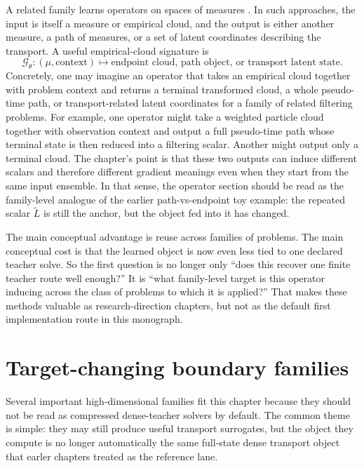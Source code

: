 A related family learns operators on spaces of measures
\citep{lu2021deeponet,li2021fourier,kovachki2023neuraloperator}.  In such
approaches, the input is itself a measure or empirical cloud, and the output is
either another measure, a path of measures, or a set of latent coordinates
describing the transport.  A useful empirical-cloud signature is
\begin{equation}
\label{eq:bf-neural-ot-dynamic-operator-signature}
  \mathcal G_\theta:
  (\mu,\text{context})
  \longmapsto
  \text{endpoint cloud, path object, or transport latent state}.
\end{equation}
Concretely, one may imagine an operator that takes an empirical cloud together
with problem context and returns a terminal transformed cloud, a whole pseudo-time
path, or transport-related latent coordinates for a family of related filtering
problems.  For example, one operator might take a weighted particle cloud together
with observation context and output a full pseudo-time path whose terminal state is
then reduced into a filtering scalar.  Another might output only a terminal cloud.
The chapter's point is that these two outputs can induce different scalars and
therefore different gradient meanings even when they start from the same input
ensemble.  In that sense, the operator section should be read as the family-level
analogue of the earlier path-vs-endpoint toy example: the repeated scalar
\(\widetilde L\) is still the anchor, but the object fed into it has changed.

The main conceptual advantage is reuse across families of problems.  The main
conceptual cost is that the learned object is now even less tied to one declared
teacher solve.  So the first question is no longer only ``does this recover one
finite teacher route well enough?''  It is ``what family-level target is this
operator inducing across the class of problems to which it is applied?''  That
makes these methods valuable as research-direction chapters, but not as the
default first implementation route in this monograph.

\section{Target-changing boundary families}
\label{sec:bf-neural-ot-dynamic-boundary-families}
\label{sec:bf-neural-ot-dynamic-sliced-localized}

Several important high-dimensional families fit this chapter because they should
not be read as compressed dense-teacher solvers by default.  The common theme is
simple: they may still produce useful transport surrogates, but the object they
compute is no longer automatically the same full-state dense transport object that
earler chapters treated as the reference lane.

